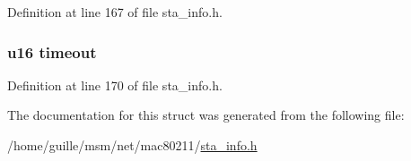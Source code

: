 Definition at line 167 of file sta\-\_\-info.\-h.

\hypertarget{structtid__ampdu__rx_a735bf6536b07682f96c9417b0f1e9079}{
\subsubsection[{timeout}]{\setlength{\rightskip}{0pt plus 5cm}u16 timeout}}\label{structtid__ampdu__rx_a735bf6536b07682f96c9417b0f1e9079}


Definition at line 170 of file sta\-\_\-info.\-h.



The documentation for this struct was generated from the following file\-:\begin{DoxyCompactItemize}
\item 
/home/guille/msm/net/mac80211/\hyperlink{sta__info_8h}{sta\-\_\-info.\-h}\end{DoxyCompactItemize}
